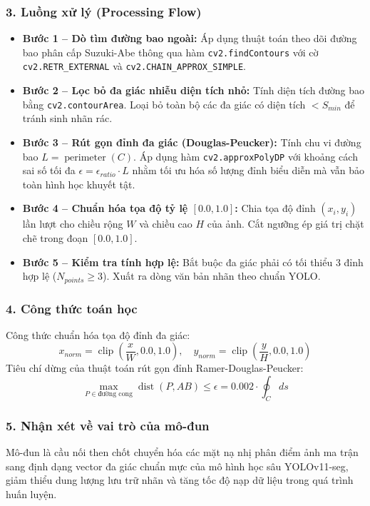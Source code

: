 \subsubsection*{3. Luồng xử lý (Processing Flow)}
\begin{itemize}
    \item \textbf{Bước 1 -- Dò tìm đường bao ngoài:} Áp dụng thuật toán theo dõi đường bao phân cấp Suzuki-Abe thông qua hàm \texttt{cv2.findContours} với cờ \texttt{cv2.RETR\_EXTERNAL} và \texttt{cv2.CHAIN\_APPROX\_SIMPLE}.
    \item \textbf{Bước 2 -- Lọc bỏ đa giác nhiễu diện tích nhỏ:} Tính diện tích đường bao bằng \texttt{cv2.contourArea}. Loại bỏ toàn bộ các đa giác có diện tích $< S_{min}$ để tránh sinh nhãn rác.
    \item \textbf{Bước 3 -- Rút gọn đỉnh đa giác (Douglas-Peucker):} Tính chu vi đường bao $L = \operatorname{perimeter}(C)$. Áp dụng hàm \texttt{cv2.approxPolyDP} với khoảng cách sai số tối đa $\epsilon = \epsilon_{ratio} \cdot L$ nhằm tối ưu hóa số lượng đỉnh biểu diễn mà vẫn bảo toàn hình học khuyết tật.
    \item \textbf{Bước 4 -- Chuẩn hóa tọa độ tỷ lệ $[0.0, 1.0]$:} Chia tọa độ đỉnh $(x_i, y_i)$ lần lượt cho chiều rộng $W$ và chiều cao $H$ của ảnh. Cắt ngưỡng ép giá trị chặt chẽ trong đoạn $[0.0, 1.0]$.
    \item \textbf{Bước 5 -- Kiểm tra tính hợp lệ:} Bắt buộc đa giác phải có tối thiểu 3 đỉnh hợp lệ ($N_{points} \ge 3$). Xuất ra dòng văn bản nhãn theo chuẩn YOLO.
\end{itemize}

\subsubsection*{4. Công thức toán học}
Công thức chuẩn hóa tọa độ đỉnh đa giác:
\begin{equation}
    x_{norm} = \operatorname{clip}\left(\frac{x}{W}, 0.0, 1.0\right), \quad y_{norm} = \operatorname{clip}\left(\frac{y}{H}, 0.0, 1.0\right)
\end{equation}
Tiêu chí dừng của thuật toán rút gọn đỉnh Ramer-Douglas-Peucker:
\begin{equation}
    \max_{P \in \text{đường cong}} \operatorname{dist}(P, AB) \le \epsilon = 0.002 \cdot \oint_C ds
\end{equation}

\subsubsection*{5. Nhận xét về vai trò của mô-đun}
Mô-đun là cầu nối then chốt chuyển hóa các mặt nạ nhị phân điểm ảnh ma trận sang định dạng vector đa giác chuẩn mực của mô hình học sâu YOLOv11-seg, giảm thiểu dung lượng lưu trữ nhãn và tăng tốc độ nạp dữ liệu trong quá trình huấn luyện.

